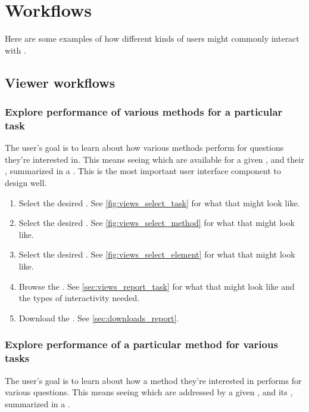 \section{Workflows}

Here are some examples of how different kinds of users might commonly interact with \phycomb.

\subsection{Viewer workflows}
\label{sec:workflows_viewer}

\subsubsection{Explore performance of various methods for a particular task}
\label{sec:workflows_task}

The user's goal is to learn about how various methods perform for questions they're interested in.
This means seeing which \Methods are available for a given \Task, and their \Performance, summarized in a \Report.
This is the most important user interface component to design well.

\begin{enumerate}
    \item Select the desired \Task.
          See \cref{fig:views_select_task} for what that might look like.
    \item Select the desired \Methods.
          See \cref{fig:views_select_method} for what that might look like.
    \item Select the desired \Elements.
          See \cref{fig:views_select_element} for what that might look like.
    \item Browse the \Report.
          See \cref{sec:views_report_task} for what that might look like and the types of interactivity needed.
    \item Download the \Report.
          See \cref{sec:downloads_report}.
\end{enumerate}

\subsubsection{Explore performance of a particular method for various tasks}
\label{sec:workflows_method}

The user's goal is to learn about how a method they're interested in performs for various questions.
This means seeing which \Tasks are addressed by a given \Method, and its \Performance, summarized in a \Report.

